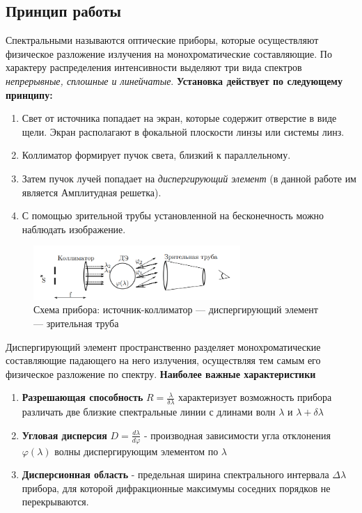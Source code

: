 \documentclass[a4paper, 12pt]{article}
\begin{document}
\subsection{Принцип работы}
    Спектральными называются оптические приборы, которые осуществляют физическое 
    разложение излучения на монохроматические составляющие. По характеру распределения 
    интенсивности выделяют три вида спектров \textit{непрерывные, сплошные и линейчатые}.
    \textbf{Установка действует по следующему принципу:}
    \begin{enumerate}
        \item Свет от источника попадает на экран, которые содержит отверстие в виде щели. Экран располагают в фокальной плоскости линзы или системы линз.
        \item Коллиматор формирует пучок света, близкий к параллельному.
        \item Затем пучок лучей попадает на \textit{диспергирующий элемент} (в данной работе им является Амплитудная решетка).
        \item С помощью зрительной трубы установленной на бесконечность можно наблюдать изображение.
    \end{enumerate}



\begin{figure}[h] %
    \centering
    \includegraphics[width=0.7\textwidth]{ust.png} %
    \caption{Схема прибора: источник-коллиматор —
    диспергирующий элемент — зрительная труба}
    \label{fig:example} %
\end{figure}

Диспергирующий элемент пространственно разделяет монохроматические составляющие 
падающего на него излучения, осуществляя тем самым его физическое разложение по спектру. 
\textbf{Наиболее важные характеристики}
    \begin{enumerate}
        \item \textbf{Разрешающая способность} $R = \frac{\lambda}{\delta \lambda}$ характеризует возможность прибора различать две близкие спектральные линии с длинами волн $\lambda$ и $\lambda + \delta \lambda$
        \item \textbf{Угловая дисперсия} $D = \frac{d\lambda}{d \varphi}$ - производная зависимости угла отклонения $\varphi(\lambda)$ волны диспергирующим элементом по $\lambda$
        \item \textbf{Дисперсионная область} - предельная ширина спектрального интервала $\Delta \lambda$ прибора, для которой дифракционные максимумы соседних порядков не перекрываются.
    \end{enumerate}
\end{document}

